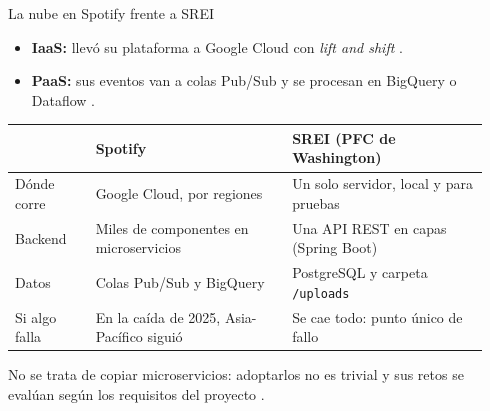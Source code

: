 \begin{frame}{La nube en Spotify frente a SREI}
  \begin{itemize}
    \item \textbf{IaaS:} llevó su plataforma a Google Cloud con
      \emph{lift and shift} \cite{strid2023fleet}.
    \item \textbf{PaaS:} sus eventos van a colas Pub/Sub y se procesan en
      BigQuery o Dataflow \cite{khlebnikova2024dataplatform}.
  \end{itemize}

  \smallskip
  \centering
  \footnotesize
  \begin{tabular}{@{}p{0.16\linewidth}p{0.39\linewidth}p{0.39\linewidth}@{}}
    \toprule
    & \textbf{Spotify} & \textbf{SREI (PFC de Washington)} \tabularnewline
    \midrule
    Dónde corre   & \raggedright Google Cloud, por regiones
                    \cite{strid2023fleet,spotifyIncident2025}
                  & \raggedright Un solo servidor, local y para pruebas \tabularnewline
    Backend       & \raggedright Miles de componentes en microservicios
                    \cite{gustavsson2023fleet}
                  & \raggedright Una API REST en capas (Spring Boot) \tabularnewline
    Datos         & \raggedright Colas Pub/Sub y BigQuery
                    \cite{khlebnikova2024dataplatform}
                  & \raggedright PostgreSQL y carpeta \texttt{/uploads} \tabularnewline
    Si algo falla & \raggedright En la caída de 2025, Asia-Pacífico siguió
                    \cite{spotifyIncident2025}
                  & \raggedright Se cae todo: punto único de fallo \tabularnewline
    \bottomrule
  \end{tabular}

  \medskip
  \raggedright
  {\scriptsize No se trata de copiar microservicios: adoptarlos no es
  trivial y sus retos se evalúan según los requisitos del proyecto
  \cite[p.~1]{soylemez2022microservices}.\par}
\end{frame}
